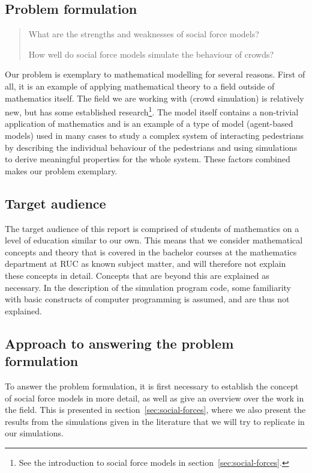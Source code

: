 \subsection{Problem formulation}
\begin{quote}
    What are the strengths and weaknesses of social force models?

    How well do social force models simulate the behaviour of crowds?
\end{quote}

Our problem is exemplary to mathematical modelling for several reasons. First 
of all, it is an example of applying mathematical theory to a field outside of 
mathematics itself. The field we are working with (crowd simulation) is 
relatively new, but has some established research\footnote{See the 
introduction to social force models in section~\ref{sec:social-forces}.}. The 
model itself contains a non-trivial application of mathematics and is an 
example of a type of model (agent-based models) used in many cases to study a 
complex system of interacting pedestrians by describing the individual 
behaviour of the pedestrians and using simulations to derive meaningful 
properties for the whole system. These factors combined makes our problem 
exemplary.

\subsection{Target audience}
The target audience of this report is comprised of students of mathematics on 
a level of education similar to our own. This means that we consider 
mathematical concepts and theory that is covered in the bachelor courses at 
the mathematics department at RUC as known subject matter, and will therefore 
not explain these concepts in detail. Concepts that are beyond this are 
explained as necessary. In the description of the simulation program code, 
some familiarity with basic constructs of computer programming is assumed, and 
are thus not explained.

\subsection{Approach to answering the problem formulation}
To answer the problem formulation, it is first necessary to establish the 
concept of social force models in more detail, as well as give an overview 
over the work in the field. This is presented in 
section~\ref{sec:social-forces}, where we also present the results from the 
simulations given in the literature that we will try to replicate in our 
simulations.

